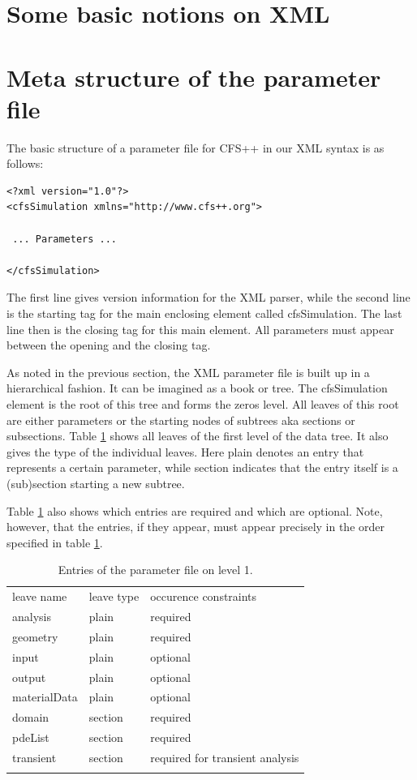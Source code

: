 \documentclass[a4paper]{article}
\newcommand{\mytabspace}{\medskip}
\begin{document}
%
%
\section{Some basic notions on XML}
%
%
\section{Meta structure of the parameter file}
%
%
The basic structure of a parameter file for CFS++ in our XML syntax is as
follows:
%
%
\begin{verbatim}
<?xml version="1.0"?>
<cfsSimulation xmlns="http://www.cfs++.org">

 ... Parameters ...

</cfsSimulation>
\end{verbatim}
%
%
The first line gives version information for the XML parser, while the second
line is the starting tag for the main enclosing element called cfsSimulation.
The last line then is the closing tag for this main element. All parameters
must appear between the opening and the closing tag.

As noted in the previous section, the XML parameter file is built up in a
hierarchical fashion. It can be imagined as a book or tree. The cfsSimulation
element is the root of this tree and forms the zeros level. All leaves of this
root are either parameters or the starting nodes of subtrees aka sections or
subsections. Table \ref{tab:Layer1Elements} shows all leaves of the first
level of the data tree. It also gives the type of the individual leaves. Here
plain denotes an entry that represents a certain parameter, while section
indicates that the entry itself is a (sub)section starting a new subtree.

Table \ref{tab:Layer1Elements} also shows which entries are required and which
are optional. Note, however, that the entries, if they appear, must appear
precisely in the order specified in table \ref{tab:Layer1Elements}.
%
%
\begin{table}
\caption{\label{tab:Layer1Elements}Entries of the parameter file on level 1.}
\mytabspace
\centering
\begin{tabular}{lll}
\hline\noalign{\smallskip}
leave name & leave type & occurence constraints \\
\noalign{\smallskip}\hline\noalign{\smallskip}
analysis     & plain   & required\\
geometry     & plain   & required\\
input        & plain   & optional\\
output       & plain   & optional\\
materialData & plain   & optional\\
domain       & section & required \\
pdeList      & section & required \\
transient    & section & required for transient analysis \\
\noalign{\smallskip}\hline
\end{tabular}
\end{table}
%
%
\end{document}
